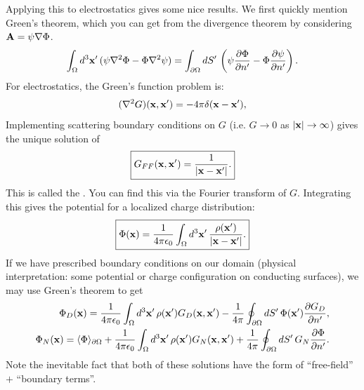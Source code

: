 \documentclass[11pt]{article}
\begin{document}
Applying this to electrostatics gives some nice results. We first
quickly mention Green's theorem, which you can get from the divergence
theorem by considering $\mathbf{A} = \psi \nabla \Phi$.
\begin{align*}
    \int_{\Omega} d^3\mathbf{x}' \, (\psi \nabla^2 \Phi - \Phi \nabla^2 \psi)
    = \int_{\partial \Omega} dS' \, \left( \psi \frac{\partial \Phi}{\partial n'} - \Phi \frac{\partial \psi}{\partial n'} \right).
\end{align*}
For electrostatics, the Green's function problem is:
\begin{align*}
    (\nabla^2 G)(\mathbf{x}, \mathbf{x}') = - 4\pi \delta(\mathbf{x} - \mathbf{x}'),
\end{align*}
Implementing scattering boundary conditions on $G$ (i.e.
$G \to 0$ as $|\mathbf{x}| \to \infty$) gives the unique solution of
\begin{align*}
    \boxed{G_{FF}(\mathbf{x}, \mathbf{x}') = \frac{1}{|\mathbf{x} - \mathbf{x}'|}.}
\end{align*}
This is called the .
You can find this via the Fourier transform of $G$.
Integrating this gives the potential for a localized charge
distribution:
\begin{align}
    \boxed{\Phi(\mathbf{x}) = \frac{1}{4\pi \epsilon_0} \int_{\Omega} d^3\mathbf{x}' \, \frac{\rho(\mathbf{x}')}{|\mathbf{x} - \mathbf{x}'|}.}
    \label{freeFieldPotential}
\end{align}
If we have prescribed boundary conditions on
our domain (physical interpretation: some potential
or charge configuration on conducting surfaces),
we may use Green's theorem to get
\begin{align*}
    \Phi_{D}(\mathbf{x}) = \frac{1}{4\pi\epsilon_0} \int_{\Omega} d^3\mathbf{x}' \, \rho(\mathbf{x}') G_D(\mathbf{x}, \mathbf{x}')
    - \frac{1}{4\pi} \oint_{\partial \Omega} dS' \, \Phi(\mathbf{x}') \frac{\partial G_D}{\partial n'},\\
    \Phi_{N}(\mathbf{x}) = \langle \Phi \rangle_{\partial \Omega} + \frac{1}{4\pi\epsilon_0} \int_{\Omega} d^3\mathbf{x}' \, \rho(\mathbf{x}') G_N(\mathbf{x}, \mathbf{x}')
    + \frac{1}{4\pi} \oint_{\partial \Omega} dS' \, G_N \frac{\partial \Phi}{\partial n'}.
\end{align*}
Note the inevitable fact that both of these solutions have the form
of ``free-field'' $+$ ``boundary terms''.
\end{document}
